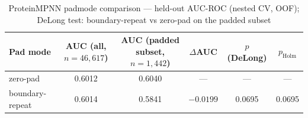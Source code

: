 \begin{table}[htbp]
\centering
\caption{ProteinMPNN padmode comparison --- held-out AUC-ROC (nested CV, OOF); DeLong test: boundary-repeat vs zero-pad on the padded subset}
\label{tab:mpnn_padmode}
\begin{tabular}{lccccc}
\toprule
Pad mode & AUC (all, $n{=}46,617$) & AUC (padded subset, $n{=}1,442$) & $\Delta$AUC & $p$ (DeLong) & $p_{\mathrm{Holm}}$ \\
\midrule
zero-pad & 0.6012 & 0.6040 & --- & --- & --- \\
boundary-repeat & 0.6014 & 0.5841 & $-0.0199$ & 0.0695 & 0.0695 \\
\bottomrule
\end{tabular}
\end{table}
